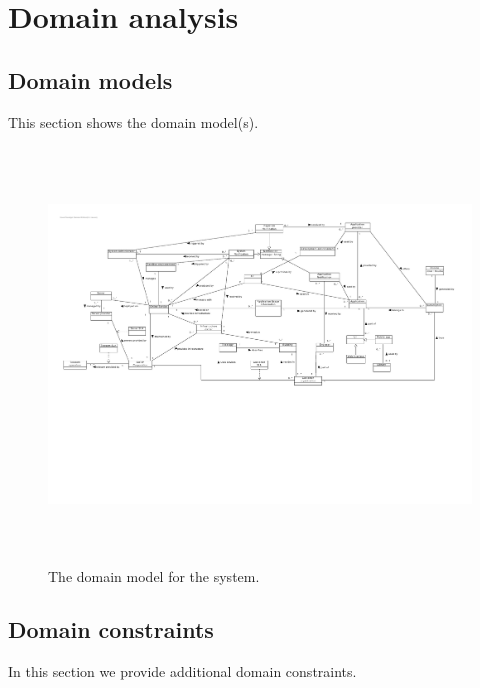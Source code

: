 \documentclass[english,peerreview]{sareport}
\begin{document}
\maketitle

\tableofcontents

\chapter{Domain analysis}\label{sec:domain}
\section{Domain models}
This section shows the domain model(s).

\begin{figure}[H]
    \centering
    \includegraphics[width=\textwidth, height=11cm, angle=90]{Domain_model.pdf}
    \caption{The domain model for the system.}\label{fig:domain_model}
\end{figure}

\section{Domain constraints}
In this section we provide additional domain constraints.
\end{document}
